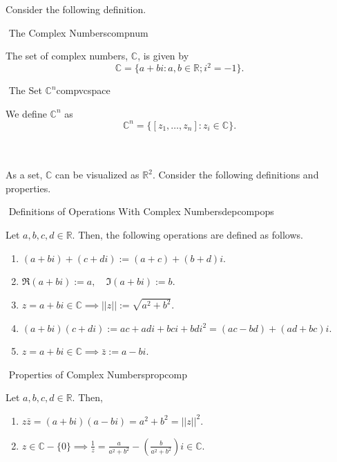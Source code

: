         Consider the following definition.
        \begin{definition}{\Stop\,\,The Complex Numbers}{compnum}

            The set of complex numbers, \(\mathbb{C}\), is given by
            \begin{equation*}
                \mathbb{C}=\{a+bi:a,b\in\mathbb{R};i^2=-1\}.
            \end{equation*}
            
        \end{definition}
        \begin{definition}{\Stop\,\,The Set \(\mathbb{C}^n\)}{compvcspace}

            We define \(\mathbb{C}^n\) as
            \begin{equation*}
                \mathbb{C}^n=\{[z_1,\ldots,z_n]:z_i\in\mathbb{C}\}.
            \end{equation*}
            
        \end{definition}
        \vphantom
        \\
        \\
        As a set, \(\mathbb{C}\) can be visualized as \(\mathbb{R}^2\). Consider the following definitions and properties.
        \begin{definition}{\Stop\,\,Definitions of Operations With Complex Numbers}{depcompops}
            
            Let \(a,b,c,d\in\mathbb{R}\). Then, the following operations are defined as follows.
            \begin{enumerate}
                \item \((a+bi)+(c+di):=(a+c)+(b+d)i\).
                \item \(\Re (a+bi):=a,\quad \Im (a+bi):=b\).
                \item \(z=a+bi\in\mathbb{C}\implies||z||:=\sqrt{a^2+b^2}\).
                \item \((a+bi)(c+di):=ac+adi+bci+bdi^2=(ac-bd)+(ad+bc)i\).
                \item \(z=a+bi\in\mathbb{C}\implies\bar{z}:=a-bi\).
            \end{enumerate}

        \end{definition}
        \begin{theorem}{\Stop\,\,Properties of Complex Numbers}{propcomp}
            
            Let \(a,b,c,d\in\mathbb{R}\). Then,
            \begin{enumerate}
                \item \(z\bar{z}=(a+bi)(a-bi)=a^2+b^2=||z||^2\).
                \item \(z\in\mathbb{C}- \{0\}\implies\frac{1}{z}=\frac{a}{a^2+b^2}-\left(\frac{b}{a^2+b^2}\right)i\in\mathbb{C}\).
            \end{enumerate}

        \end{theorem}
